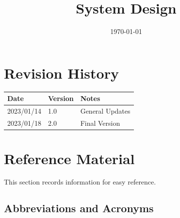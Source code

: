 \documentclass[12pt, titlepage]{article}
\begin{document}
\title{\huge{System Design} \\ \progname{}} 
\author{\authname}
\date{\today}

\maketitle


\section{Revision History}

\begin{tabularx}{\textwidth}{p{3cm}p{2cm}X}
\toprule {\bf Date} & {\bf Version} & {\bf Notes}\\
\midrule
2023/01/14 & 1.0 & General Updates\\
2023/01/18 & 2.0 & Final Version\\
\bottomrule
\end{tabularx}

\newpage

\section{Reference Material}

This section records information for easy reference.

\subsection{Abbreviations and Acronyms}
\end{document}
